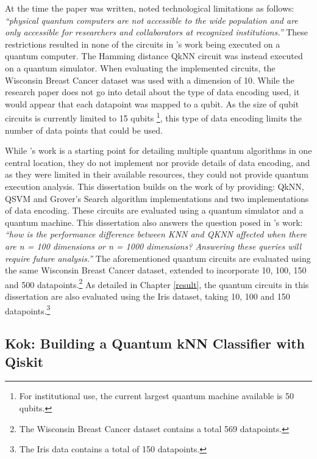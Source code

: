 At the time the paper was written, \citeauthor{sharmaQeml} noted technological limitations as follows: \emph{``physical quantum computers are not accessible to the wide population and are only accessible for researchers and collaborators at recognized institutions.''} These restrictions resulted in none of the circuits in \citeauthor{sharmaQeml}'s work being executed on a quantum computer. The Hamming distance QkNN circuit was instead executed on a quantum simulator. When evaluating the implemented circuits, the Wisconsin Breast Cancer dataset \citep{BCWisconsinData} was used with a dimension of 10. While the research paper does not go into detail about the type of data encoding used, it would appear that each datapoint was mapped to a qubit. As the size of qubit circuits is currently limited to 15 qubits \footnote{For institutional use, the current largest quantum machine available is 50 qubits.}, this type of data encoding limits the number of data points that could be used.

While \citeauthor{sharmaQeml}'s work is a starting point for detailing multiple quantum algorithms in one central location, they do not implement nor provide details of data encoding, and as they were limited in their available resources, they could not provide quantum execution analysis. This dissertation builds on the work of \citeauthor{sharmaQeml} by providing: QkNN, QSVM and Grover’s Search algorithm implementations and two implementations of data encoding. These circuits are evaluated using a quantum simulator and a quantum machine. This dissertation also answers the question posed in \citeauthor{sharmaQeml}'s work: \emph{``how is the performance difference between KNN and QKNN affected when there are n = 100 dimensions or n = 1000 dimensions? Answering these queries will require future analysis.''} The aforementioned quantum circuits are evaluated using the same Wisconsin Breast Cancer dataset, extended to incorporate 10, 100, 150 and 500 datapoints.\footnote{The Wisconsin Breast Cancer dataset contains a total 569 datapoints.} As detailed in Chapter \ref{result}, the quantum circuits in this dissertation are also evaluated using the Iris dataset, taking 10, 100 and 150 datapoints.\footnote{The Iris data contains a total of 150 datapoints.}




\subsection{Kok: Building a Quantum kNN Classifier with Qiskit}

